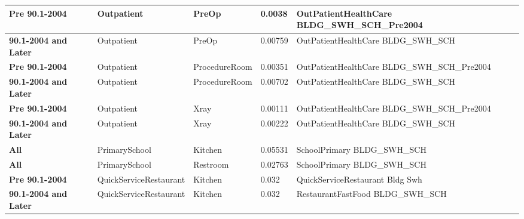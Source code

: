 \begin{table}
\begin{tabular}{|p{3cm}|p{3cm}|p{3cm}|p{3cm}|p{3cm}|}
\textbf{Pre 90.1-2004}  & Outpatient             & PreOp           & 0.0038  & OutPatientHealthCare   BLDG\_SWH\_SCH\_Pre2004 \\ \hline
\textbf{90.1-2004 and Later} & Outpatient             & PreOp           & 0.00759 & OutPatientHealthCare   BLDG\_SWH\_SCH          \\ \hline
\textbf{Pre 90.1-2004}  & Outpatient             & ProcedureRoom   & 0.00351 & OutPatientHealthCare   BLDG\_SWH\_SCH\_Pre2004 \\ \hline
\textbf{90.1-2004 and Later} & Outpatient             & ProcedureRoom   & 0.00702 & OutPatientHealthCare   BLDG\_SWH\_SCH          \\ \hline
\textbf{Pre 90.1-2004}  & Outpatient             & Xray            & 0.00111 & OutPatientHealthCare   BLDG\_SWH\_SCH\_Pre2004 \\ \hline
\textbf{90.1-2004 and Later} & Outpatient             & Xray            & 0.00222 & OutPatientHealthCare   BLDG\_SWH\_SCH          \\ \hline
\textbf{All}                     & PrimarySchool          & Kitchen         & 0.05531 & SchoolPrimary   BLDG\_SWH\_SCH                 \\ \hline
\textbf{All}                     & PrimarySchool          & Restroom        & 0.02763 & SchoolPrimary   BLDG\_SWH\_SCH                 \\ \hline
\textbf{Pre 90.1-2004}  & QuickServiceRestaurant & Kitchen         & 0.032   & QuickServiceRestaurant   Bldg Swh              \\ \hline
\textbf{90.1-2004 and Later} & QuickServiceRestaurant & Kitchen         & 0.032   & RestaurantFastFood   BLDG\_SWH\_SCH            \\ \hline
\end{tabular}
\end{table}